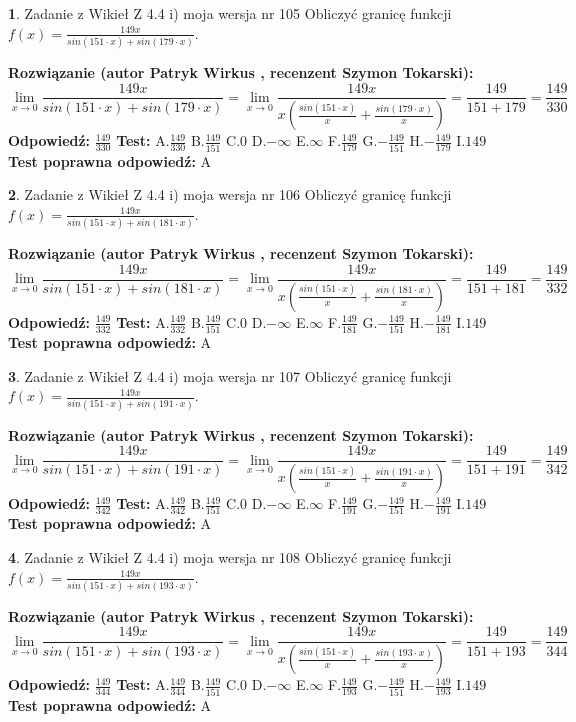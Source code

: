 \documentclass[12pt, a4paper]{article}
\theoremstyle{definition} %
\newtheorem{zad}{}
\newcommand{\zadStart}[1]{\begin{zad}#1\newline}
\newcommand{\zadStop}{\end{zad}}
\newcommand{\rozwStart}[2]{\noindent \textbf{Rozwiązanie (autor #1 , recenzent #2): }\newline}
\newcommand{\rozwStop}{\newline}
\newcommand{\odpStart}{\noindent \textbf{Odpowiedź:}\newline}
\newcommand{\odpStop}{\newline}
\newcommand{\testStart}{\noindent \textbf{Test:}\newline}
\newcommand{\testStop}{\newline}
\newcommand{\kluczStart}{\noindent \textbf{Test poprawna odpowiedź:}\newline}
\newcommand{\kluczStop}{\newline}
\begin{document}
\zadStart{Zadanie z Wikieł Z 4.4 i) moja wersja nr 105}
Obliczyć granicę funkcji $f(x)=\frac{149x}{sin(151\cdot x) +sin(179\cdot x)}$.
\zadStop
\rozwStart{Patryk Wirkus}{Szymon Tokarski}
$$\lim\limits_{x\to 0}\frac{149x}{sin(151\cdot x) +sin(179\cdot x)}=\lim\limits_{x\to 0}\frac{149x}{x(\frac{sin(151\cdot x)}{x}+\frac{sin(179\cdot x)}{x})}=\frac{149}{151+179} = \frac{149}{330}$$
\rozwStop
\odpStart
$\frac{149}{330}$
\odpStop
\testStart
A.$\frac{149}{330}$
B.$\frac{149}{151}$
C.$0$
D.$-\infty$
E.$\infty$
F.$\frac{149}{179}$
G.$-\frac{149}{151}$
H.$-\frac{149}{179}$
I.$149$
\testStop
\kluczStart
A
\kluczStop



\zadStart{Zadanie z Wikieł Z 4.4 i) moja wersja nr 106}
Obliczyć granicę funkcji $f(x)=\frac{149x}{sin(151\cdot x) +sin(181\cdot x)}$.
\zadStop
\rozwStart{Patryk Wirkus}{Szymon Tokarski}
$$\lim\limits_{x\to 0}\frac{149x}{sin(151\cdot x) +sin(181\cdot x)}=\lim\limits_{x\to 0}\frac{149x}{x(\frac{sin(151\cdot x)}{x}+\frac{sin(181\cdot x)}{x})}=\frac{149}{151+181} = \frac{149}{332}$$
\rozwStop
\odpStart
$\frac{149}{332}$
\odpStop
\testStart
A.$\frac{149}{332}$
B.$\frac{149}{151}$
C.$0$
D.$-\infty$
E.$\infty$
F.$\frac{149}{181}$
G.$-\frac{149}{151}$
H.$-\frac{149}{181}$
I.$149$
\testStop
\kluczStart
A
\kluczStop



\zadStart{Zadanie z Wikieł Z 4.4 i) moja wersja nr 107}
Obliczyć granicę funkcji $f(x)=\frac{149x}{sin(151\cdot x) +sin(191\cdot x)}$.
\zadStop
\rozwStart{Patryk Wirkus}{Szymon Tokarski}
$$\lim\limits_{x\to 0}\frac{149x}{sin(151\cdot x) +sin(191\cdot x)}=\lim\limits_{x\to 0}\frac{149x}{x(\frac{sin(151\cdot x)}{x}+\frac{sin(191\cdot x)}{x})}=\frac{149}{151+191} = \frac{149}{342}$$
\rozwStop
\odpStart
$\frac{149}{342}$
\odpStop
\testStart
A.$\frac{149}{342}$
B.$\frac{149}{151}$
C.$0$
D.$-\infty$
E.$\infty$
F.$\frac{149}{191}$
G.$-\frac{149}{151}$
H.$-\frac{149}{191}$
I.$149$
\testStop
\kluczStart
A
\kluczStop



\zadStart{Zadanie z Wikieł Z 4.4 i) moja wersja nr 108}
Obliczyć granicę funkcji $f(x)=\frac{149x}{sin(151\cdot x) +sin(193\cdot x)}$.
\zadStop
\rozwStart{Patryk Wirkus}{Szymon Tokarski}
$$\lim\limits_{x\to 0}\frac{149x}{sin(151\cdot x) +sin(193\cdot x)}=\lim\limits_{x\to 0}\frac{149x}{x(\frac{sin(151\cdot x)}{x}+\frac{sin(193\cdot x)}{x})}=\frac{149}{151+193} = \frac{149}{344}$$
\rozwStop
\odpStart
$\frac{149}{344}$
\odpStop
\testStart
A.$\frac{149}{344}$
B.$\frac{149}{151}$
C.$0$
D.$-\infty$
E.$\infty$
F.$\frac{149}{193}$
G.$-\frac{149}{151}$
H.$-\frac{149}{193}$
I.$149$
\testStop
\kluczStart
A
\kluczStop
\end{document}

